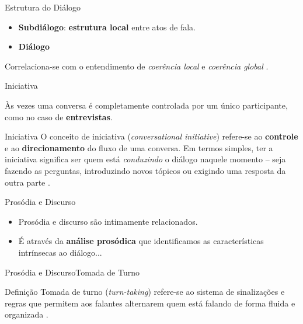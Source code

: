 \begin{frame}{Estrutura do Diálogo}
  \begin{block}{}
    \begin{itemize}
      \item \textbf{Subdiálogo}: \textbf{estrutura local} entre atos de fala.
      \item \textbf{Diálogo}
    \end{itemize}
  \end{block}
  \pause
  \begin{block}{}
    Correlaciona-se com o entendimento de \textit{coerência local} e \textit{coerência
    global} \cite{lang_processing_book}.
  \end{block}
\end{frame}

\begin{frame}{Iniciativa}
  \begin{block}{}
    Às vezes uma conversa é completamente controlada por um único participante, como no
    caso de \textbf{entrevistas}.
  \end{block}
  \pause
  \begin{block}{Iniciativa}
    O conceito de iniciativa (\textit{conversational initiative}) refere-se ao
    \textbf{controle} e ao \textbf{direcionamento} do fluxo de uma conversa. Em termos
    simples, ter a iniciativa significa ser quem está \textit{conduzindo} o diálogo
    naquele momento -- seja fazendo as perguntas, introduzindo novos tópicos ou exigindo
    uma resposta da outra parte  \cite{lang_processing_book}.
  \end{block}
\end{frame}

\begin{frame}{Prosódia e Discurso}
  \begin{block}{}
    \begin{itemize}
      \item Prosódia e discurso são intimamente relacionados.
        \pause
      \item É através da \textbf{análise prosódica} que identificamos as características
        intrínsecas ao diálogo...
    \end{itemize}
  \end{block}
\end{frame}

\begin{frame}{Prosódia e Discurso}{Tomada de Turno}
  \begin{block}{Definição}
    Tomada de turno (\textit{turn-taking}) refere-se ao sistema de sinalizações e regras
    que permitem aos falantes alternarem quem está falando de forma fluida e organizada
    \cite{Prosodia_Barbosa_2012} \cite{prosodia_plinio_barbosa_book}.
  \end{block}
\end{frame}

